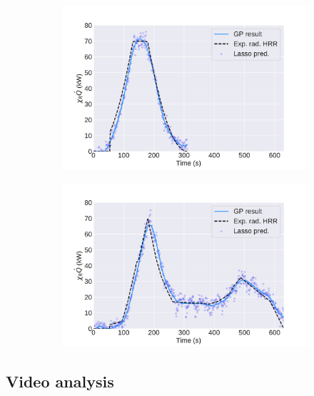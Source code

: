 \documentclass{article}
\begin{document}
\begin{figure}[htbp]
\begin{subfigure}[t]{.45\textwidth}
      \includegraphics[width=\textwidth ,keepaspectratio]{figures/dft_result_t_squared.pdf}
      \caption{}
      \label{fig:dft_result_t_squared}
  \end{subfigure}
    \begin{subfigure}[t]{.45\textwidth}
      \centering
      \includegraphics[width=\textwidth ,keepaspectratio]{figures/dft_result_weird_curve.pdf}
      \caption{}
      \label{fig:dft_result_weird_curve}
  \end{subfigure}
  \caption{} 
  \label{fig:dft_gp_results}
\end{figure}


\subsection{Video analysis}
\end{document}
